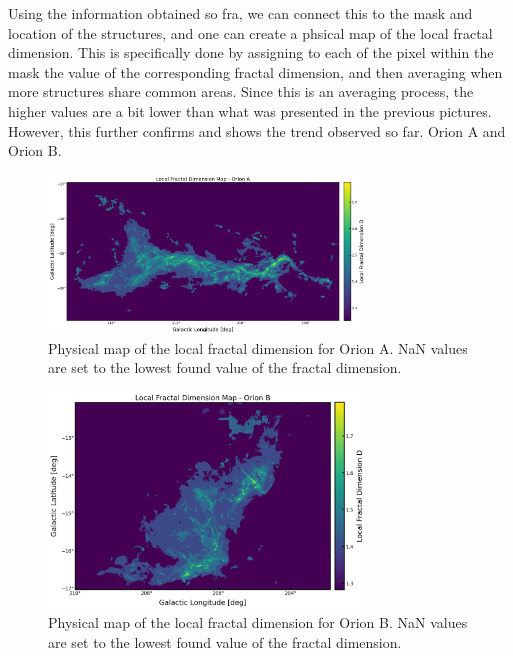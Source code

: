 Using the information obtained so fra, we can connect this to the mask and location of the structures, and one can create a phsical map of the local fractal dimension. This is specifically done by assigning to each of the pixel within the mask the value of the corresponding fractal dimension, and then averaging when more structures share common areas.
Since this is an averaging process, the higher values are a bit lower than what was presented in the previous pictures. However, this further confirms and shows the trend observed so far.
Orion A and Orion B.

\begin{figure}[t]
    \centering
    \includegraphics[width=0.75\textwidth]{figures/local_fractal_dimension_map_Orion_A.png}
    \caption{Physical map of the local fractal dimension for Orion A. NaN values are set to the lowest found value of the fractal dimension.}
    \label{fig:local_A_map}
\end{figure}

\begin{figure}[t]
    \centering
    \includegraphics[width=0.75\textwidth]{figures/local_fractal_dimension_map_Orion_B.png}
    \caption{Physical map of the local fractal dimension for Orion B. NaN values are set to the lowest found value of the fractal dimension.}
    \label{fig:local_B_map}
\end{figure}

